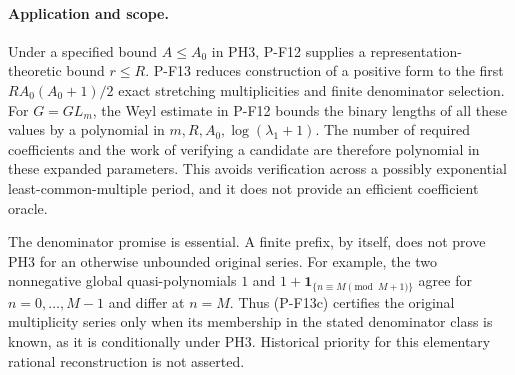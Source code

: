 \paragraph{Application and scope.}
Under a specified bound $A\le A_0$ in PH3, P-F12 supplies a
representation-theoretic bound $r\le R$. P-F13 reduces construction of
a positive form to the first $RA_0(A_0+1)/2$ exact stretching
multiplicities and finite denominator selection. For $G=GL_m$, the
Weyl estimate in P-F12 bounds the binary lengths of all these values
by a polynomial in $m,R,A_0,\log(\lambda_1+1)$. The number of
required coefficients and the work of verifying a candidate are
therefore polynomial in these expanded parameters. This avoids
verification across a possibly exponential least-common-multiple
period, and it does not provide an efficient coefficient oracle.

The denominator promise is essential. A finite prefix, by itself,
does not prove PH3 for an otherwise unbounded original series.
For example, the two nonnegative global quasi-polynomials
$1$ and $1+\mathbf1_{\{n\equiv M\pmod{M+1}\}}$ agree for
$n=0,\ldots,M-1$ and differ at $n=M$. Thus (P-F13c) certifies the
original multiplicity series only when its membership in the stated
denominator class is known, as it is conditionally under PH3.
Historical priority for this elementary rational reconstruction is
not asserted.
